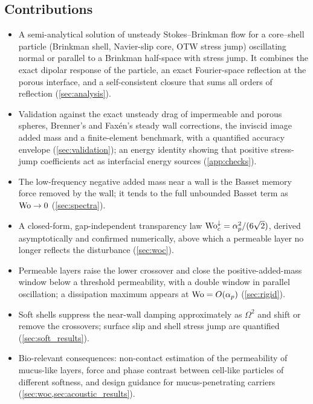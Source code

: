 \subsection*{Contributions}
\begin{itemize}
  \item A semi-analytical solution of unsteady Stokes--Brinkman flow for a core--shell particle (Brinkman shell, Navier-slip
        core, OTW stress jump) oscillating normal or parallel to a Brinkman half-space with stress jump. It combines the
        exact dipolar response of the particle, an exact Fourier-space reflection at the porous interface, and a
        self-consistent closure that sums all orders of reflection (\cref{sec:analysis}).
  \item Validation against the exact unsteady drag of impermeable and porous spheres, Brenner's and Faxén's steady wall
        corrections, the inviscid image added mass and a finite-element benchmark, with a quantified accuracy envelope
        (\cref{sec:validation}); an energy identity showing that positive stress-jump coefficients act as interfacial
        energy sources (\cref{app:checks}).
  \item The low-frequency negative added mass near a wall is the Basset memory force removed by the wall; it tends to the
        full unbounded Basset term as $\mathrm{Wo}\to0$ (\cref{sec:spectra}).
  \item A closed-form, gap-independent transparency law $\mathrm{Wo}_c^{\downarrow}=\alpha_p^2/(6\sqrt2)$, derived asymptotically
        and confirmed numerically, above which a permeable layer no longer reflects the disturbance (\cref{sec:woc}).
  \item Permeable layers raise the lower crossover and close the positive-added-mass window below a threshold
        permeability, with a double window in parallel oscillation; a dissipation maximum appears at $\mathrm{Wo}=O(\alpha_p)$
        (\cref{sec:rigid}).
  \item Soft shells suppress the near-wall damping approximately as $\Omega^2$ and shift or remove the crossovers;
        surface slip and shell stress jump are quantified (\cref{sec:soft_results}).
  \item Bio-relevant consequences: non-contact estimation of the permeability of mucus-like layers, force and phase contrast
        between cell-like particles of different softness, and design guidance for mucus-penetrating carriers
        (\cref{sec:woc,sec:acoustic_results}).
\end{itemize}

